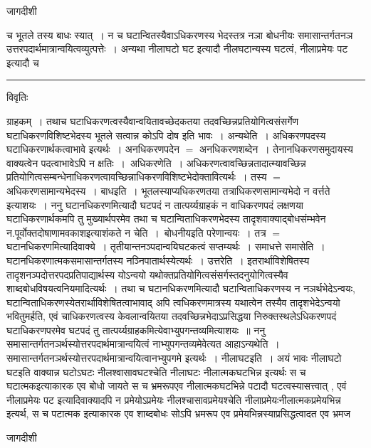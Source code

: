 \documentclass[10pt, openany]{book}
\begin{document}
{\begin{center} जागदीशी \end{center}
{\la च भूतले तस्य बाधः स्यात्~। न च घटान्वितस्यैवाऽधिकरणस्य भेदस्तत्र
नञा बोधनीयः समासान्तर्गतनञ उत्तरपदार्थमात्रान्वयित्वव्युत्पत्तेः~।
अन्यथा नीलाघटो घट इत्यादौ नीलघटान्यस्य घटत्वं, नीलाप्रमेयः पट इत्यादौ च}\\
\hrule
\begin{center}     विवृतिः \end{center}
ग्राहकम्~। तथाच घटाधिकरणत्वस्यैवान्वयितावच्छेदकतया तदवच्छिन्नप्रतियोगित्वसंसर्गेण घटाधिकरणविशिष्टभेदस्य भूतले सत्वान्न कोऽपि दोष इति भावः~। {\qt अन्यथेति~}। अधिकरणपदस्य घटाधिकरणार्थकत्वाभावे इत्यर्थः~। अनधिकरणपदेन $=$ अनधिकरणशब्देन~। तेनानधिकरणसमुदायस्य वाक्यत्वेन पदत्वाभावेऽपि न क्षतिः~।~{\la अधिकरणेति~।} अधिकरणत्वावच्छिन्नतादात्म्यावच्छिन्न प्रतियोगित्वसम्बन्धेनाधिकरणत्वावच्छिन्नाधिकरणविशिष्टभेदोक्तावित्यर्थः~। तस्य $=$ अधिकरणसामान्यभेदस्य~। बाधइति~। भूतलस्याप्यधिकरणतया तत्राधिकरणसामान्यभेदो
न वर्त्तते इत्याशयः~। ननु घटानधिकरणमित्यादौ घटपदं न तात्पर्य्यग्राहकं
न वाधिकरणपदं लक्षणया घटाधिकरणार्थकमपि तु मुख्यार्थपरमेव तथा च घटान्विताधिकरणभेदस्य तादृशवाक्याद्बोधसंम्भवेन न.पूर्वोक्तदोषाणामवकाशइत्याशंकते {\la न चेति~।}~बोधनीयइति परेणान्वयः~। तत्र $=$ घटानधिकरणमित्यादिवाक्ये~। तृतीयान्तनञ्पदान्वयिघटकत्वं सप्तम्यर्थः~। समाधत्ते समासेति~। घटानधिकरणात्मकसमासान्तर्गतस्य नञ्निपातार्थस्येत्यर्थः~। उत्तरेति~। इतरार्थाविशेषितस्य तादृशनञ्पदोत्तरपदप्रतिपाद्यार्थस्य योऽन्वयो यथोक्तप्रतियोगित्वसंसर्गस्तदनुयोगित्वस्यैव शाब्दबोधविषयत्वनियमादित्यर्थः~। तथा च घटानधिकरणमित्यादौ घटान्विताधिकरणस्य न नञर्थभेदेऽन्वयः, घटान्विताधिकरणस्येतरार्थाविशेषितत्वाभावाद् अपि त्वधिकरणमात्रस्य यथात्वेन तस्यैव तादृशभेदेऽन्वयो भवितुमर्हति, एवं चाधिकरणत्वस्य केवलान्वयितया तदवच्छिन्नभेदाऽप्रसिद्धया निरुक्तस्थलेऽधिकरणपदं घटाधिकरणपरमेव घटपदं तु तात्पर्य्यग्राहकमित्येवाभ्युपगन्तव्यमित्याशयः~॥ ननु समासान्तर्गतनञर्थस्योत्तरपदार्थमात्रान्वयित्वं नाभ्युपगन्तव्यमेवेत्यत आहाऽन्यथेति~।
समासान्तर्गतनञर्थस्योत्तरपदार्थमात्रान्वयित्वानभ्युपगमे इत्यर्थः~। नीलाघटइति~। {\qt अयं भावः } नीलाघटो घटइति वाक्यान्न घटोऽघटः नीलश्वासावघटश्चेति नीलाघटः नीलात्मकघटभिन्न इत्यर्थः स च घटात्मकइत्याकारक एव बोधो जायते स च भ्रमरूपएव नीलात्मकघटभिन्ने पटादौ घटत्वस्यासत्त्वात् , एवं नीलाप्रमेयः पट इत्यादिवाक्यादपि न प्रमेयोऽप्रमेयः नीलश्चासावप्रमेयश्चेति नीलाप्रमेयःनीलात्मकप्रमेयभिन्न इत्यर्थ, स च पटात्मक इत्याकारक एव शाब्दबोधः सोऽपि भ्रमरूप एव प्रमेयभिन्नस्याप्रसिद्धत्वादत एव भ्रमज
\newpage
\lfoot{}
\begin{center} जागदीशी \end{center}
}
\end{document}
